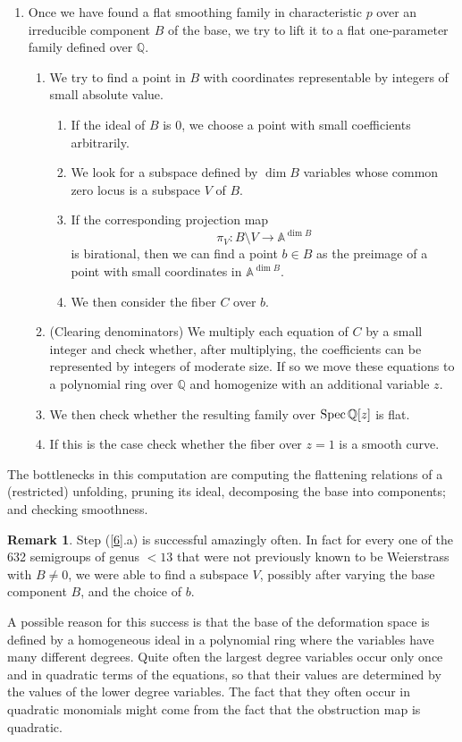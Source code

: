 \documentclass[twoside,12pt, leqno]{amsart}
\theoremstyle{definition}
\newtheorem{remark}[theorem]{Remark}
\def\AA{{\mathbb A}}
\def\QQ{{\mathbb Q}}
\DeclareMathOperator{\Spec}{{Spec}}
\def\Spec{{{\rm Spec}\,}}
\begin{document}
\begin{enumerate}
\begin{enumerate}
\end{enumerate}

\item \label{6} Once we have found a flat smoothing family in characteristic $p$ over an irreducible component $B$ of the base, we try to lift it to a flat one-parameter family defined over $\QQ$.

\begin{enumerate}
 \item We try to find a point in $B$ with coordinates representable by integers of small absolute value. 
 \begin{enumerate}
     \item If the ideal of  $B$ is 0, we choose a point with small coefficients arbitrarily.
     \item We look for a subspace defined by $\dim B$ variables  whose common zero locus is a subspace $V$ of $B$.
    \item If the corresponding projection  map
    $$ \pi_{V}\colon B\setminus V \to \AA^{\dim B}$$ 
     is birational, then we can find a point $b\in B$ as the preimage of a point with small coordinates
    in $\AA^{\dim B}$.
  
   \item We then consider the fiber $C$ over $b$.
   \end{enumerate}
 \item (Clearing denominators) We multiply each equation of $C$ by a small integer and check whether, after multiplying, the coefficients can be represented by  integers of moderate size. If so we move these  equations to a polynomial ring over $\QQ$ and homogenize with an additional variable $z$.
 \item We then check whether the resulting family over $\Spec \QQ[z]$ is flat.
 \item If this is the case check whether the fiber over $z=1$ is a smooth curve.    
 \end{enumerate}
\end{enumerate}

The bottlenecks in this computation are computing  the flattening relations of a (restricted) unfolding, pruning its ideal, decomposing the base into  components; and checking smoothness. 

\begin{remark}
Step (\ref{6}.a) is  successful amazingly often. In fact for every one of the 632 semigroups of genus $<13$ that were not previously known to be Weierstrass with $B\neq 0$, we were able to find a subspace $V$, possibly after varying the base component $B$, and the choice of $b$. 

 A possible reason for this success is that the base of the deformation space is defined by a homogeneous ideal in a polynomial ring where  the variables have many different degrees. Quite often the largest degree variables occur only once and in quadratic terms of the equations, so that their values are determined by the values of the lower degree variables.
The fact that they often occur in quadratic monomials might come from the fact that the obstruction map is quadratic.
\end{remark}

 

                  

\end{document}
